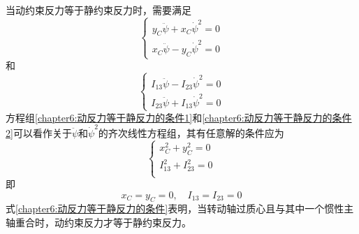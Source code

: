 当动约束反力等于静约束反力时，需要满足
\begin{equation}
\begin{cases}
	y_C\ddot{\psi}+x_C\dot{\psi}^2=0 \\
	x_C\ddot{\psi}-y_C\dot{\psi}^2=0
\end{cases}
\label{chapter6:动反力等于静反力的条件1}
\end{equation}
和
\begin{equation}
\begin{cases}
	I_{13}\ddot{\psi}-I_{23}\dot{\psi}^2=0 \\
	I_{23}\ddot{\psi}+I_{13}\dot{\psi}^2=0
\end{cases}
\label{chapter6:动反力等于静反力的条件2}
\end{equation}
方程组\eqref{chapter6:动反力等于静反力的条件1}和\eqref{chapter6:动反力等于静反力的条件2}可以看作关于$\ddot{\psi}$和$\dot{\psi}^2$的齐次线性方程组，其有任意解的条件应为
\begin{equation*}
\begin{cases}
	x_C^2+y_C^2=0 \\
	I_{13}^2+I_{23}^2=0 \\
\end{cases}
\end{equation*}
即
\begin{equation}
	x_C=y_C=0,\quad I_{13}=I_{23}=0
	\label{chapter6:动反力等于静反力的条件}
\end{equation}
式\eqref{chapter6:动反力等于静反力的条件}表明，当转动轴过质心且与其中一个惯性主轴重合时，动约束反力才等于静约束反力。



